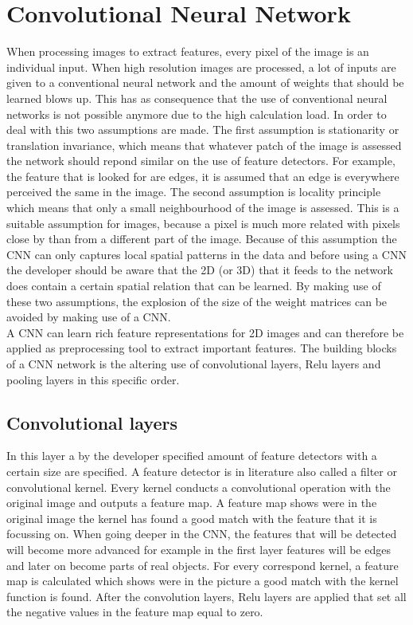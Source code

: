 \documentclass[a4paper,10pt]{article}
\begin{document}
\section{Convolutional Neural Network}
When processing images to extract features, every pixel of the image is an individual input. When high resolution images are processed, a lot of inputs are given to a conventional neural network and the amount of weights that should be learned blows up. This has as consequence that the use of conventional neural networks is not possible anymore due to the high calculation load. In order to deal with this two assumptions are made. The first assumption is stationarity or translation invariance, which means that whatever patch of the image is assessed the network should repond similar on the use of feature detectors. For example, the feature that is looked for are edges, it is assumed that an edge is everywhere perceived the same in the image. The second assumption is locality principle which means that only a small neighbourhood of the image is assessed. This is a suitable assumption for images, because a pixel is much more related with pixels close by than from a different part of the image. Because of this assumption the CNN can only captures local spatial patterns in the data and before using a CNN the developer should be aware that the 2D (or 3D) that it feeds to the network does contain a certain spatial relation that can be learned. By making use of these two assumptions, the explosion of the size of the weight matrices can be avoided by making use of a CNN.\\

A CNN can learn rich feature representations for 2D images and can therefore be applied as preprocessing tool to extract important features. The building blocks of a CNN network is the altering use of convolutional layers, Relu layers and pooling layers in this specific order. 

\subsection{Convolutional layers}
In this layer a by the developer specified amount of feature detectors with a certain size are specified. A feature detector is in literature also called a filter or convolutional kernel. Every kernel conducts a convolutional operation with the original image and outputs a feature map. A feature map shows were in the original image the kernel has found a good match with the feature that it is focussing on. When going deeper in the CNN, the features that will be detected will become more advanced for example in the first layer features will be edges and later on become parts of real objects. For every correspond kernel, a feature map is calculated which shows were in the picture a good match with the kernel function is found. After the convolution layers, Relu layers are applied that set all the negative values in the feature map equal to zero. 
\end{document}
